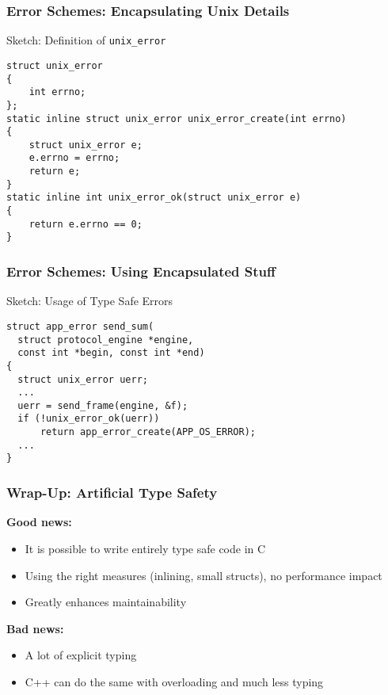 \begin{frame}[fragile]
  \frametitle{Error Schemes: Encapsulating Unix Details}

  \begin{block}{Sketch: Definition of \texttt{unix\_error}}
\begin{verbatim}
struct unix_error
{
    int errno;
};
static inline struct unix_error unix_error_create(int errno)
{
    struct unix_error e;
    e.errno = errno;
    return e;
}
static inline int unix_error_ok(struct unix_error e)
{
    return e.errno == 0;
}
\end{verbatim}
  \end{block}

\end{frame}

\begin{frame}[fragile]
  \frametitle{Error Schemes: Using Encapsulated Stuff}

  \begin{block}{Sketch: Usage of Type Safe Errors}
\begin{verbatim}
struct app_error send_sum(
  struct protocol_engine *engine,
  const int *begin, const int *end)
{
  struct unix_error uerr;
  ...
  uerr = send_frame(engine, &f);
  if (!unix_error_ok(uerr))
      return app_error_create(APP_OS_ERROR);
  ...
}
\end{verbatim}
  \end{block}

\end{frame}

\begin{frame}
  \frametitle{Wrap-Up: Artificial Type Safety}

  \textbf{Good news:}

  \begin{itemize}
  \item It is possible to write entirely type safe code in C
  \item Using the right measures (inlining, small structs), no
    performance impact
  \item Greatly enhances maintainability
  \end{itemize}

  \textbf{Bad news:}

  \begin{itemize}
  \item A lot of explicit typing
  \item C++ can do the same with overloading and much less typing
  \end{itemize}

\end{frame}
